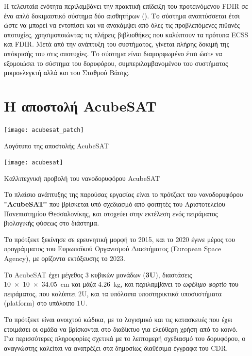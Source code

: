 \documentclass[a4paper,nobib]{tufte-book}
\begin{document}
Η τελευταία ενότητα περιλαμβάνει την πρακτική επίδειξη του προτεινόμενου \acs{FDIR} σε ένα απλό δοκιμαστικό σύστημα δύο αισθητήρων (). Το σύστημα αναπτύσσεται έτσι ώστε να μπορεί να εντοπίσει και να ανακάμψει από όλες τις προβλεπόμενες πιθανές αποτυχίες, χρησιμοποιώντας τις πλήρεις βιβλιοθήκες που καλύπτουν τα πρότυπα \acs{ECSS} και \acs{FDIR}. Μετά από την ανάπτυξη του συστήματος, γίνεται πλήρης δοκιμή της απόκρισής του στις αποτυχίες. Το σύστημα είναι διαμορφωμένο έτσι ώστε να εξομοιώσει το σύστημα του δορυφόρου, συμπεριλαμβανομένου του συστήματος μικροελεγκτή αλλά και του Σταθμού Βάσης.

\chapter{Η αποστολή AcubeSAT}
\label{cap:acubesat}

\begin{marginfigure}
	\texttt{[image: acubesat\_patch]}
	\caption{Λογότυπο της αποστολής AcubeSAT}
\end{marginfigure}

\begin{marginfigure}
	\centering
	\texttt{[image: acubesat]}
	\caption{Καλλιτεχνική προβολή του νανοδορυφόρου AcubeSAT}
\end{marginfigure}

Το πλαίσιο ανάπτυξης της παρούσας εργασίας είναι το πρότζεκτ του νανοδορυφόρου \textbf{"AcubeSAT"} που βρίσκεται υπό σχεδιασμό από φοιτητές του Αριστοτελείου Πανεπιστημίου Θεσσαλονίκης, και στοχεύει στην εκτέλεση ενός πειράματος βιολογικής φύσεως στο διάστημα.

Το πρότζεκτ ξεκίνησε σε ερευνητική μορφή το 2015, και το 2020 έγινε μέρος του προγράμματος  του Ευρωπαϊκού Οργανισμού Διαστήματος (European Space Agency), με ορίζοντα εκτόξευσης το 2023.

Το AcubeSAT έχει μέγεθος 3 κυβικών μονάδων (\textbf{3U}), διαστάσεις \SI[product-units = single]{10 x 10 x 34.05}{\centi\metre} και μάζα \SI{4.26}{\kilogram}, και περιλαμβάνει το \emph{ωφέλιμο φορτίο} του πειράματος, που καλύπτει 2U, και τα υπόλοιπα υποστηρικτικά υποσυστήματα (platform) στο υπόλοιπο 1U.

Το πρότζεκτ είναι ανοιχτού κώδικα, με το λογισμικό και τις κατασκευές που έχει ετοιμάσει οι ομάδα να βρίσκονται στο διαδίκτυο για ελεύθερη χρήση από το κοινό.  Για περισσότερες πληροφορίες σχετικά με το λεπτομερή σχεδιασμό του δορυφόρου, ο αναγνώστης καλείται να ανατρέξει στα δημοσίως διαθέσιμα έγγραφα του \acf{CDR}.
\end{document}
